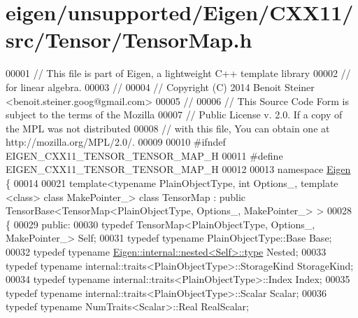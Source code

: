 \hypertarget{eigen_2unsupported_2_eigen_2_c_x_x11_2src_2_tensor_2_tensor_map_8h_source}{}\section{eigen/unsupported/\+Eigen/\+C\+X\+X11/src/\+Tensor/\+Tensor\+Map.h}
\label{eigen_2unsupported_2_eigen_2_c_x_x11_2src_2_tensor_2_tensor_map_8h_source}

\begin{DoxyCode}
00001 \textcolor{comment}{// This file is part of Eigen, a lightweight C++ template library}
00002 \textcolor{comment}{// for linear algebra.}
00003 \textcolor{comment}{//}
00004 \textcolor{comment}{// Copyright (C) 2014 Benoit Steiner <benoit.steiner.goog@gmail.com>}
00005 \textcolor{comment}{//}
00006 \textcolor{comment}{// This Source Code Form is subject to the terms of the Mozilla}
00007 \textcolor{comment}{// Public License v. 2.0. If a copy of the MPL was not distributed}
00008 \textcolor{comment}{// with this file, You can obtain one at http://mozilla.org/MPL/2.0/.}
00009 
00010 \textcolor{preprocessor}{#ifndef EIGEN\_CXX11\_TENSOR\_TENSOR\_MAP\_H}
00011 \textcolor{preprocessor}{#define EIGEN\_CXX11\_TENSOR\_TENSOR\_MAP\_H}
00012 
00013 \textcolor{keyword}{namespace }\hyperlink{namespace_eigen}{Eigen} \{
00014 
00021 \textcolor{keyword}{template}<\textcolor{keyword}{typename} PlainObjectType, \textcolor{keywordtype}{int} Options\_, \textcolor{keyword}{template} <\textcolor{keyword}{class}> \textcolor{keyword}{class }MakePointer\_> \textcolor{keyword}{class }TensorMap : \textcolor{keyword}{
      public} TensorBase<TensorMap<PlainObjectType, Options\_, MakePointer\_> >
00028 \{
00029   \textcolor{keyword}{public}:
00030     \textcolor{keyword}{typedef} TensorMap<PlainObjectType, Options\_, MakePointer\_> Self;
00031     \textcolor{keyword}{typedef} \textcolor{keyword}{typename} PlainObjectType::Base Base;
00032     \textcolor{keyword}{typedef} \textcolor{keyword}{typename} \hyperlink{class_eigen_1_1internal_1_1_tensor_lazy_evaluator_writable}{Eigen::internal::nested<Self>::type} Nested;
00033     \textcolor{keyword}{typedef} \textcolor{keyword}{typename} internal::traits<PlainObjectType>::StorageKind StorageKind;
00034     \textcolor{keyword}{typedef} \textcolor{keyword}{typename} internal::traits<PlainObjectType>::Index Index;
00035     \textcolor{keyword}{typedef} \textcolor{keyword}{typename} internal::traits<PlainObjectType>::Scalar Scalar;
00036     \textcolor{keyword}{typedef} \textcolor{keyword}{typename} NumTraits<Scalar>::Real RealScalar;

\end{DoxyCode}
